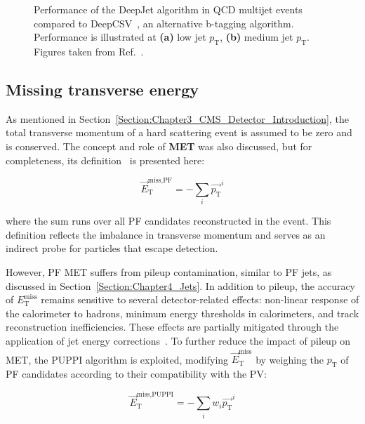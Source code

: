 \begin{figure}[h]
\begin{subfigure}[b]{0.49\textwidth}
        \caption{}
    \end{subfigure}
\caption[Performance of the DeepJet algorithm in QCD multijet events]{Performance of the DeepJet algorithm in QCD multijet events compared to DeepCSV~\cite{HeavyFlavourJets_ID}, an alternative b-tagging algorithm. Performance is illustrated at \textbf{(a)} low jet $p_\mathrm{T}$, \textbf{(b)} medium jet $p_\mathrm{T}$. Figures taken from Ref.~\cite{DeepJet}.}

\label{Figure:Chapter4_DeepJetPerformance}
\end{figure}

\subsection{Missing transverse energy}
As mentioned in Section~\ref{Section:Chapter3_CMS_Detector_Introduction}, the total transverse momentum of a hard scattering event is assumed to be zero and is conserved. The concept and role of \textbf{MET} was also discussed, but for completeness, its definition~\cite{MET_Reconstruction} is presented here:

\begin{equation}
    \vec{E}_\mathrm{T}^{\text{miss,PF}} = - \sum_i \vec{p_\mathrm{T}}^i
\end{equation}

where the sum runs over all PF candidates reconstructed in the event. This definition reflects the imbalance in transverse momentum and serves as an indirect probe for particles that escape detection.

However, PF MET suffers from pileup contamination, similar to PF jets, as discussed in Section~\ref{Section:Chapter4_Jets}. In addition to pileup, the accuracy of $E_\mathrm{T}^{\text{miss}}$ remains sensitive to several detector-related effects: non-linear response of the calorimeter to hadrons, minimum energy thresholds in calorimeters, and track reconstruction inefficiencies. These effects are partially mitigated through the application of jet energy corrections~\cite{JetEnergyCalibration}. To further reduce the impact of pileup on MET, the PUPPI algorithm is exploited, modifying $\vec{E}_\mathrm{T}^{\text{miss}}$ by weighing the $p_\mathrm{T}$ of PF candidates according to their compatibility with the PV:

\begin{equation}
    \vec{E}_\mathrm{T}^{\text{miss,PUPPI}} = - \sum_i w_i\vec{p_\mathrm{T}}^i
\end{equation}

